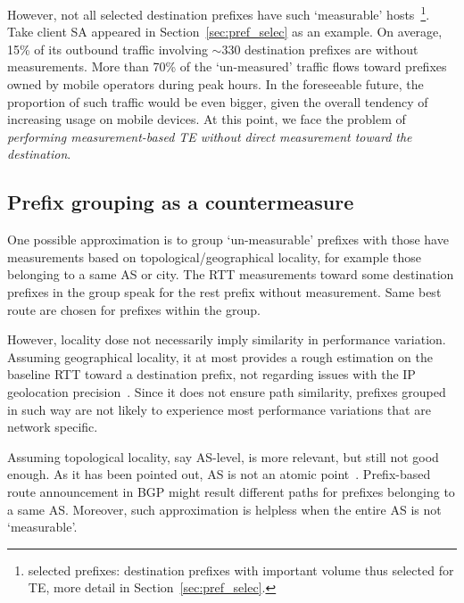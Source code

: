 However, not all selected destination prefixes have such `measurable' hosts~\footnote{selected prefixes: destination prefixes with important volume thus selected for TE, more detail in Section~\ref{sec:pref_selec}.}.
Take client SA appeared in Section~\ref{sec:pref_selec} as an example.
On average, 15\% of its outbound traffic involving $\sim 330$ destination prefixes are without measurements.
More than 70\% of the `un-measured' traffic flows toward prefixes owned by mobile operators during peak hours.
In the foreseeable future, the proportion of such traffic would be even bigger, given the overall tendency of increasing usage on mobile devices.
At this point, we face the problem of \textit{performing measurement-based TE without direct measurement toward the destination}. 

\subsection{Prefix grouping as a countermeasure}
One possible approximation is to group `un-measurable' prefixes with those have measurements based on topological/geographical locality, for example those belonging to a same AS or city. 
The RTT measurements toward some destination prefixes in the group speak for the rest prefix without measurement. Same best route are chosen for prefixes within the group.
 
However, locality dose not necessarily imply similarity in performance variation.
Assuming geographical locality, it at most provides a rough estimation on the baseline RTT toward a destination prefix, not regarding issues with the IP geolocation precision~\cite{Poese2011}. Since it does not ensure path similarity, prefixes grouped in such way are not likely to experience most performance variations that are network specific.

Assuming topological locality, say AS-level, is more relevant, but still not good enough.
As it has been pointed out, AS is not an atomic point~\cite{Muhlbauer2006}. 
Prefix-based route announcement in BGP might result different paths for prefixes belonging to a same AS. 
Moreover, such approximation is helpless when the entire AS is not `measurable'.

